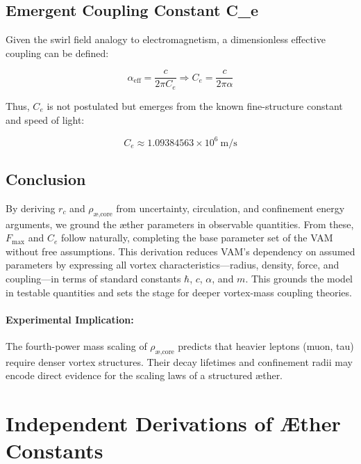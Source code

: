         \subsection{ Emergent Coupling Constant C_e}
        Given the swirl field analogy to electromagnetism, a dimensionless effective coupling can be defined:

        \begin{equation}
        \alpha_\text{eff} = \frac{c}{2\pi C_e} \Rightarrow C_e = \frac{c}{2\pi \alpha}
        \end{equation}

        Thus, $C_e$ is not postulated but emerges from the known fine-structure constant and speed of light:

        \begin{equation}
        C_e \approx 1.09384563 \times 10^6 \ \text{m/s}
        \end{equation}


        \subsection{Conclusion}

        By deriving $r_c$ and $\rho_{\text{\ae,core}}$ from uncertainty, circulation, and confinement energy arguments, we ground the \ae{}ther parameters in observable quantities. From these, $F_{\max}$ and $C_e$ follow naturally, completing the base parameter set of the VAM without free assumptions. This derivation reduces VAM's dependency on assumed parameters by expressing all vortex characteristics—radius, density, force, and coupling—in terms of standard constants \(\hbar\), \(c\), \(\alpha\), and \(m\). This grounds the model in testable quantities and sets the stage for deeper vortex-mass coupling theories.

        \paragraph{Experimental Implication:} The fourth-power mass scaling of $\rho_{\text{\ae,core}}$ predicts that heavier leptons (muon, tau) require denser vortex structures. Their decay lifetimes and confinement radii may encode direct evidence for the scaling laws of a structured \ae{}ther.




\section{Independent Derivations of Æther Constants}

